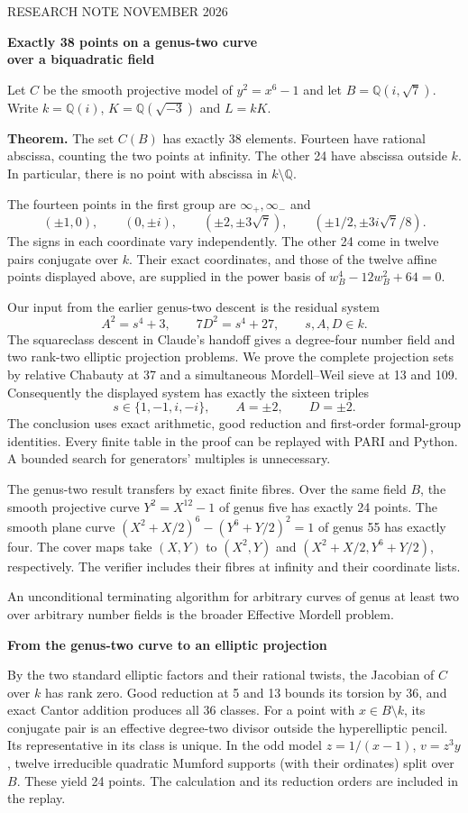 \documentclass[12pt]{article}
\newcommand{\Q}{\mathbb Q}\newcommand{\Z}{\mathbb Z}\newcommand{\F}{\mathbb F}
\newcommand{\head}[1]{{\Large\bfseries\color{ink}#1}\par\smallskip}
\newcommand{\subh}[1]{\par\smallskip{\bfseries\color{accent}#1}\par}
\begin{document}
{\small\sffamily\color{accent} RESEARCH NOTE  NOVEMBER 2026}\par
{\LARGE\bfseries\color{ink}Exactly 38 points on a genus-two curve\\over a biquadratic field}\par
Let $C$ be the smooth projective model of $y^2=x^6-1$ and let $B=\Q(i,\sqrt7)$. Write $k=\Q(i)$, $K=\Q(\sqrt{-3})$ and $L=kK$.

\textbf{Theorem.} The set $C(B)$ has exactly 38 elements. Fourteen have rational abscissa, counting the two points at infinity. The other 24 have abscissa outside $k$. In particular, there is no point with abscissa in $k\setminus\Q$.

The fourteen points in the first group are $\infty_+,\infty_-$ and
\[
 (\pm1,0),\qquad (0,\pm i),\qquad
 (\pm2,\pm3\sqrt7),\qquad (\pm1/2,\pm3i\sqrt7/8).
\]
The signs in each coordinate vary independently. The other 24 come in twelve pairs conjugate over $k$. Their exact coordinates, and those of the twelve affine points displayed above, are supplied in the power basis of $w_B^4-12w_B^2+64=0$.

Our input from the earlier genus-two descent is the residual system
\[
       A^2=s^4+3,\qquad 7D^2=s^4+27,\qquad s,A,D\in k .
\]
The squareclass descent in Claude's handoff gives a degree-four number field and two rank-two elliptic projection problems. We prove the complete projection sets by relative Chabauty at 37 and a simultaneous Mordell--Weil sieve at 13 and 109. Consequently the displayed system has exactly the sixteen triples
\[
              s\in\{1,-1,i,-i\},\qquad A=\pm2,\qquad D=\pm2 .
\]
The conclusion uses exact arithmetic, good reduction and first-order formal-group identities. Every finite table in the proof can be replayed with PARI and Python. A bounded search for generators' multiples is unnecessary.

\subh{Scope}
The genus-two result transfers by exact finite fibres. Over the same field $B$, the smooth projective curve $Y^2=X^{12}-1$ of genus five has exactly 24 points. The smooth plane curve $(X^2+X/2)^6-(Y^6+Y/2)^2=1$ of genus 55 has exactly four. The cover maps take $(X,Y)$ to $(X^2,Y)$ and $(X^2+X/2,Y^6+Y/2)$, respectively. The verifier includes their fibres at infinity and their coordinate lists.

An unconditional terminating algorithm for arbitrary curves of genus at least two over arbitrary number fields is the broader Effective Mordell problem.

\newpage
\head{From the genus-two curve to an elliptic projection}
By the two standard elliptic factors and their rational twists, the Jacobian of $C$ over $k$ has rank zero. Good reduction at 5 and 13 bounds its torsion by 36, and exact Cantor addition produces all 36 classes. For a point with $x\in B\setminus k$, its conjugate pair is an effective degree-two divisor outside the hyperelliptic pencil. Its representative in its class is unique. In the odd model $z=1/(x-1)$, $v=z^3y$, twelve irreducible quadratic Mumford supports (with their ordinates) split over $B$. These yield 24 points. The calculation and its reduction orders are included in the replay.
\end{document}

